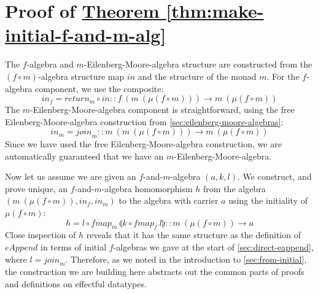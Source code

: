 \documentclass{jfp1}
\newcommand{\pattynote}[1]{\todo[inline, color=green!40]{#1}}
\newcommand{\fold}[1]{\llparenthesis #1 \rrparenthesis}
\newcommand{\thmref}[1]{\hyperref[#1]{Theorem \ref*{#1}}}
\begin{document}
\pattynote{Add other future work?}




\appendix

\section{Proof of \thmref{thm:make-initial-f-and-m-alg}}
\label{sec:make-initial-fm-proof}

\begin{proof*}
  The $f$-algebra and $m$-Eilenberg-Moore-algebra structure are
  constructed from the $(f \circ m)$-algebra structure map
  $\mathit{in}$ and the structure of the monad $m$.  For the
  $f$-algebra component, we use the composite:
  \begin{displaymath}
    \mathit{in}_f = \mathit{return}_m \circ \mathit{in} :: f~(m~(\mu(f \circ m))) \to m~(\mu(f \circ m))
  \end{displaymath}
  The $m$-Eilenberg-Moore-algebra component is straightforward, using
  the free Eilenberg-Moore-algebra construction from
  \autoref{sec:eilenberg-moore-algebras}:
  \begin{displaymath}
    \mathit{in}_m = \mathit{join}_m :: m~(m~(\mu(f \circ m))) \to m~(\mu(f \circ m))
  \end{displaymath}
  Since we have used the free Eilenberg-Moore-algebra construction, we
  are automatically guaranteed that we have an
  $m$-Eilenberg-Moore-algebra.

  Now let us assume we are given an $f$-and-$m$-algebra $(a,k,l)$. We
  construct, and prove unique, an $f$-and-$m$-algebra homomorphism $h$
  from the algebra $(m~(\mu(f \circ m)), \mathit{in}_f,
  \mathit{in}_m)$ to the algebra with carrier $a$ using the initiality
  of $\mu(f \circ m)$:
  \begin{displaymath}
    h = l \circ \mathit{fmap}_m~\fold{k \circ \mathit{fmap}_f~l} :: m~(\mu(f \circ m)) \to a
  \end{displaymath}
  Close inspection of $h$ reveals that it has the same structure as
  the definition of $\mathit{eAppend}$ in terms of initial
  $f$-algebras we gave at the start of \autoref{sec:direct-eappend},
  where $l = \mathit{join}_m$. Therefore, as we noted in the
  introduction to \autoref{sec:from-initial}, the construction we are
  building here abstracts out the common parts of proofs and
  definitions on effectful datatypes.


\end{proof*}
\end{document}
